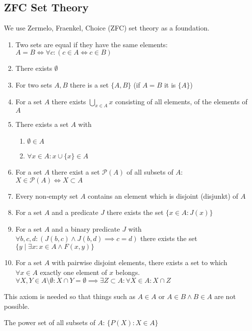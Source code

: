 \subsection{ZFC Set Theory}
\begin{definition}\label{def:zfc}
   We use Zermelo, Fraenkel, Choice (ZFC) set theory as a foundation.
   \begin{enumerate}
      \item Two sets are equal if they have the same elements: \(A = B \iff \forall c: (c \in A \iff c \in B)\)
      \item There exists \(\emptyset\)
      \item For two sets \(A, B\) there is a set \(\{A, B\}\) (if \(A = B\) it is \(\{A\}\))
      \item For a set \(A\) there exists \(\bigcup_{x \in A} x\) consisting of all elements, of the elements of \(A\)
      \item There exists a set \(A\) with
      \begin{enumerate}[label=\roman*, align=Center]
         \item \(\emptyset \in A\)
         \item \(\forall x \in A: x \cup \{x\} \in A\)
      \end{enumerate}
      \item For a set \(A\) there exist a set \(\mathcal{P}(A)\) of all subsets of \(A\): \(X \in \mathcal{P}(A) \iff X \subset A\)
      \item Every non-empty set \(A\) contains an element which is disjoint (disjunkt) of \(A\)
      \item For a set \(A\) and a predicate \(J\) there exists the set \(\{x \in A: J(x)\}\)
      \item For a set \(A\) and a binary predicate \(J\) with \(\forall b, c, d: (J(b, c) \land J(b, d) \implies c = d)\) there exists the set \(\{y \mid \exists x: x \in A \land F(x, y)\}\)
      \item For a set \(A\) with pairwise disjoint elements, there exists a set to which \(\forall x \in A\) exactly one element of \(x\) belongs.
         \(\forall X, Y \in A \setminus \emptyset: X \cap Y = \emptyset \implies \exists Z \subset A: \forall X \in A: X \cap Z\)
   \end{enumerate}
\end{definition}
\begin{example}[ZFC 7.]
   This axiom is needed so that things such as \(A \in A\) or \(A \in B \land B \in A\) are not possible.
\end{example}
\begin{example}[ZFC 9.]
   The power set of all subsets of \(A\): \(\{P(X): X \in A\}\)
\end{example}

